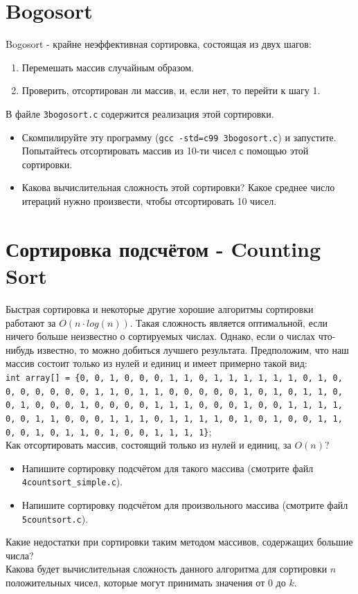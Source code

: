 \documentclass{article}
\begin{document}
\newpage
\section*{Bogosort}
Bogosort - крайне неэффективная сортировка, состоящая из двух шагов:
\begin{enumerate}
\item Перемешать массив случайным образом.
\item Проверить, отсортирован ли массив, и, если нет, то перейти к шагу 1.
\end{enumerate}
В файле \texttt{3bogosort.c} содержится реализация этой сортировки.
\begin{itemize}
\item Скомпилируйте эту программу (\texttt{gcc -std=c99 3bogosort.c}) и запустите. Попытайтесь отсортировать массив из 10-ти чисел с помощью этой сортировки.
\item Какова вычислительная сложность этой сортировки? Какое среднее число итераций нужно произвести, чтобы отсортировать 10 чисел.
\end{itemize}

\section*{Сортировка подсчётом - Counting Sort}
Быстрая сортировка и некоторые другие хорошие алгоритмы сортировки работают за $O(n \cdot log(n))$. Такая сложность является оптимальной, если ничего больше неизвестно о сортируемых числах. Однако, если о числах что-нибудь известно, то можно добиться лучшего результата. Предположим, что наш массив состоит только из нулей и единиц и имеет примерно такой вид: \\
\texttt{int array[] = \{0, 0, 1, 0, 0, 0, 1, 1, 0, 1, 1, 1, 1, 1, 1, 0, 1, 0, 0, 0, 0, 0, 0, 0, 1, 1, 0, 1, 1, 0, 0, 0, 0, 0, 1, 0, 1, 0, 1, 1, 0, 0, 1, 0, 0, 0, 1, 0, 0, 0, 0, 1, 1, 1, 0, 0, 0, 1, 0, 0, 1, 1, 1, 1, 0, 0, 1, 1, 0, 0, 0, 1, 1, 1, 0, 1, 1, 1, 1, 0, 1, 0, 1, 0, 0, 1, 1, 0, 0, 1, 0, 1, 1, 0, 1, 0, 0, 1, 1, 1, 1\}};\\
Как отсортировать массив, состоящий только из нулей и единиц, за $O(n)$?\\
\begin{itemize}
\item Напишите сортировку подсчётом для такого массива (смотрите файл \texttt{4countsort\_simple.c}).
\item Напишите сортировку подсчётом для произвольного массива (смотрите файл \texttt{5countsort.c}).
\end{itemize}
Какие недостатки при сортировки таким методом массивов, содержащих большие числа?\\
Какова будет вычислительная сложность данного алгоритма для сортировки $n$ положительных чисел, которые могут принимать значения от $0$ до $k$.
\end{document}

